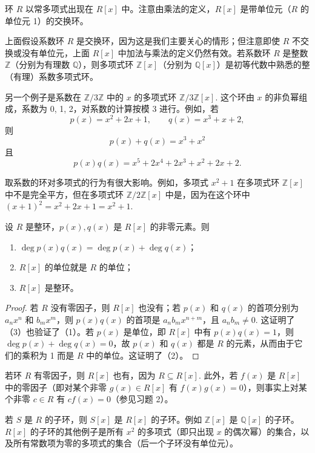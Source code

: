 环 \(R\) 以常多项式出现在 \(R[x]\) 中。注意由乘法的定义，\(R[x]\) 是带单位元（\(R\) 的单位元 1）的交换环。

上面假设系数环 \(R\) 是交换环，因为这是我们主要关心的情形；但注意即使 \(R\) 不交换或没有单位元，上面 \(R[x]\) 中加法与乘法的定义仍然有效。若系数环 \(R\) 是整数 \(\mathbb{Z}\)（分别为有理数 \(\mathbb{Q}\)），则多项式环 \(\mathbb{Z}[x]\)（分别为 \(\mathbb{Q}[x]\)）是初等代数中熟悉的整（有理）系数多项式环。

另一个例子是系数在 \(\mathbb{Z}/3\mathbb{Z}\) 中的 \(x\) 的多项式环 \(\mathbb{Z}/3\mathbb{Z}[x]\). 这个环由 \(x\) 的非负幂组成，系数为 0, 1, 2，对系数的计算按模 3 进行。例如，若
\[
p(x) = x^2 + 2x + 1, \qquad q(x) = x^3 + x + 2,
\]
则
\[
p(x) + q(x) = x^3 + x^2
\]
且
\[
p(x)q(x) = x^5 + 2x^4 + 2x^3 + x^2 + 2x + 2.
\]

取系数的环对多项式的行为有很大影响。例如，多项式 \(x^2 + 1\) 在多项式环 \(\mathbb{Z}[x]\) 中不是完全平方，但在多项式环 \(\mathbb{Z}/2\mathbb{Z}[x]\) 中是，因为在这个环中 \((x+1)^2 = x^2 + 2x + 1 = x^2 + 1\).

\begin{proposition}\label{pro:7.4}
设 \(R\) 是整环，\(p(x), q(x)\) 是 \(R[x]\) 的非零元素。则

\begin{enumerate}[label=(\arabic*)]
\item \(\deg p(x)q(x) = \deg p(x) + \deg q(x)\)；
\item \(R[x]\) 的单位就是 \(R\) 的单位；
\item \(R[x]\) 是整环。
\end{enumerate}
\end{proposition}

\begin{proof}
若 \(R\) 没有零因子，则 \(R[x]\) 也没有；若 \(p(x)\) 和 \(q(x)\) 的首项分别为 \(a_nx^n\) 和 \(b_mx^m\)，则 \(p(x)q(x)\) 的首项是 \(a_nb_mx^{n+m}\)，且 \(a_nb_m \neq 0\). 这证明了（3）也验证了（1）。若 \(p(x)\) 是单位，即 \(R[x]\) 中有 \(p(x)q(x) = 1\)，则 \(\deg p(x) + \deg q(x) = 0\)，故 \(p(x)\) 和 \(q(x)\) 都是 \(R\) 的元素，从而由于它们的乘积为 1 而是 \(R\) 中的单位。这证明了（2）。
\end{proof}

若环 \(R\) 有零因子，则 \(R[x]\) 也有，因为 \(R \subseteq R[x]\). 此外，若 \(f(x)\) 是 \(R[x]\) 中的零因子（即对某个非零 \(g(x) \in R[x]\) 有 \(f(x)g(x) = 0\)），则事实上对某个非零 \(c \in R\) 有 \(cf(x) = 0\)（参见习题 2）。

若 \(S\) 是 \(R\) 的子环，则 \(S[x]\) 是 \(R[x]\) 的子环。例如 \(\mathbb{Z}[x]\) 是 \(\mathbb{Q}[x]\) 的子环。\(R[x]\) 的子环的其他例子是所有 \(x^2\) 的多项式（即只出现 \(x\) 的偶次幂）的集合，以及所有常数项为零的多项式的集合（后一个子环没有单位元）。


